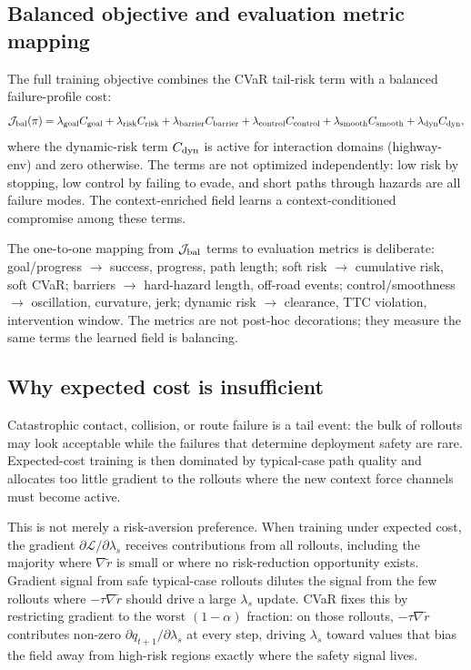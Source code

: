 \subsection{Balanced objective and evaluation metric mapping}
\label{app:jbal}

The full training objective combines the CVaR tail-risk term with a
balanced failure-profile cost:
\begin{equation}
\mathcal{J}_{\rm bal}(\pi)
=
\lambda_{\rm goal}C_{\rm goal}
+\lambda_{\rm risk}C_{\rm risk}
+\lambda_{\rm barrier}C_{\rm barrier}
+\lambda_{\rm control}C_{\rm control}
+\lambda_{\rm smooth}C_{\rm smooth}
+\lambda_{\rm dyn}C_{\rm dyn},
\label{eq:jbal}
\end{equation}
where the dynamic-risk term $C_{\rm dyn}$ is active for interaction
domains (highway-env) and zero otherwise.
The terms are not optimized independently: low risk by stopping, low
control by failing to evade, and short paths through hazards are all
failure modes.
The context-enriched field learns a context-conditioned compromise among these terms.

The one-to-one mapping from $\mathcal{J}_{\rm bal}$ terms to evaluation
metrics is deliberate: goal/progress $\to$ success, progress, path
length; soft risk $\to$ cumulative risk, soft CVaR; barriers $\to$
hard-hazard length, off-road events; control/smoothness $\to$ oscillation,
curvature, jerk; dynamic risk $\to$ clearance, TTC violation,
intervention window.
The metrics are not post-hoc decorations; they measure the same terms the
learned field is balancing.

\subsection{Why expected cost is insufficient}
\label{app:cvar_motivation}

Catastrophic contact, collision, or route failure is a tail event: the
bulk of rollouts may look acceptable while the failures that determine
deployment safety are rare.
Expected-cost training is then dominated by typical-case path quality
and allocates too little gradient to the rollouts where the new context
force channels must become active.

This is not merely a risk-aversion preference.
When training under expected cost, the gradient
$\partial\mathcal{L}/\partial\lambda_s$ receives contributions from all
rollouts, including the majority where $\nabla\tilde r$ is small or
where no risk-reduction opportunity exists.
Gradient signal from safe typical-case rollouts dilutes the signal from
the few rollouts where $-\tau\nabla\tilde r$ should drive a large
$\lambda_s$ update.
CVaR fixes this by restricting gradient to the worst $(1-\alpha)$
fraction: on those rollouts, $-\tau\nabla\tilde r$ contributes non-zero
$\partial q_{t+1}/\partial\lambda_s$ at every step, driving $\lambda_s$
toward values that bias the field away from high-risk regions exactly
where the safety signal lives.

